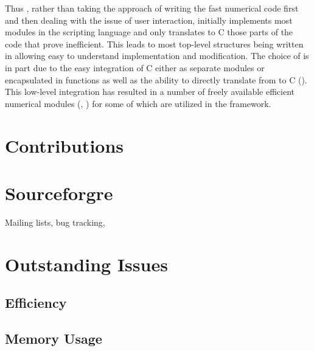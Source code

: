 Thus \FiPy{}, rather than taking the approach of writing the fast
numerical code first and then dealing with the issue of user
interaction, initially implements most modules in the \Python{}
scripting language and only translates to C those parts of the code
that prove inefficient. This leads to most top-level structures being
written in \Python{} allowing easy to understand implementation and
modification. The choice of \Python{} is in part due to the easy
integration of C either as separate modules or encapsulated in
\Python{} functions as well as the ability to directly translate from
\Python{} to C (\PyRex{}). This low-level integration has resulted
in a number of freely available efficient numerical modules (\SciPy{},
\Numeric{}) for \Python{} some of which are utilized in the \FiPy{}
framework.

\section{Contributions}

\section{Sourceforgre}

Mailing lists, bug tracking, 

\section{Outstanding Issues}

\subsection{Efficiency}

\subsection{Memory Usage}